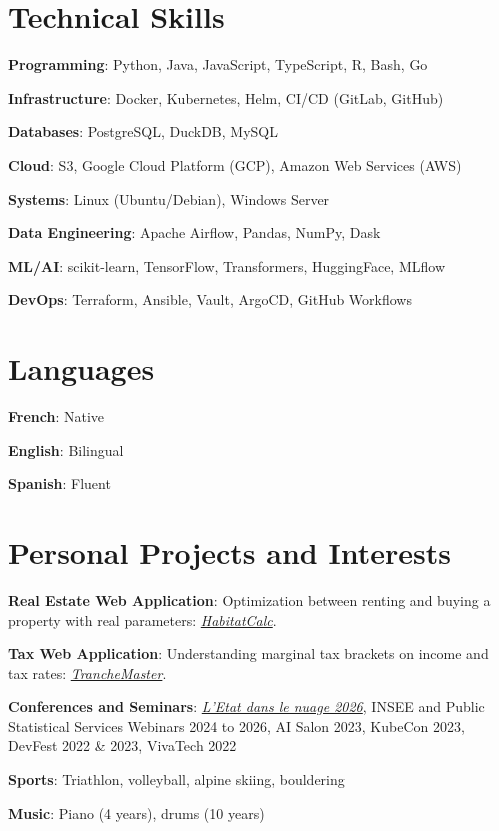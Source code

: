 \documentclass[a4paper,10pt]{article}
\newcommand{\resumeItem}[2]{
  \item\small{
    \textbf{#1}{: #2\vspace{-0.8pt}}
  }
}
\newcommand{\resumeSubItem}[2]{
    \small{\resumeItem{#1}{#2}\vspace{-4pt}}
	
}
\newcommand{\resumeSubHeadingListStart}{\begin{itemize}[leftmargin=*]}
\newcommand{\resumeSubHeadingListEnd}{\end{itemize}}
\begin{document}
\begin{minipage}[t]{0.65\linewidth}
    \section{Technical Skills}
    \resumeSubHeadingListStart
    \resumeSubItem{Programming}{Python, Java, JavaScript, TypeScript, R, Bash, Go}
    \resumeSubItem{Infrastructure}{Docker, Kubernetes, Helm, CI/CD (GitLab, GitHub)}
    \resumeSubItem{Databases}{PostgreSQL, DuckDB, MySQL}
    \resumeSubItem{Cloud}{S3, Google Cloud Platform (GCP), Amazon Web Services (AWS)}
    \resumeSubItem{Systems}{Linux (Ubuntu/Debian), Windows Server}
    \resumeSubItem{Data Engineering}{Apache Airflow, Pandas, NumPy, Dask}
    \resumeSubItem{ML/AI}{scikit-learn, TensorFlow, Transformers, HuggingFace, MLflow}
    \resumeSubItem{DevOps}{Terraform, Ansible, Vault, ArgoCD, GitHub Workflows}
    \resumeSubHeadingListEnd
    \end{minipage}
\hfill
\begin{minipage}[t]{0.3\linewidth}
    \section{Languages}
    \resumeSubHeadingListStart
    \resumeSubItem{French}{Native}
    \resumeSubItem{English}{Bilingual}
    \resumeSubItem{Spanish}{Fluent}
    \resumeSubHeadingListEnd
\end{minipage}



\section{Personal Projects and Interests}
\vspace{0.5mm}
\begin{minipage}[t]{0.9865\textwidth}
\resumeSubHeadingListStart
  \resumeSubItem{Real Estate Web Application}{Optimization between renting and buying a property with real parameters: \href{https://odysseu.github.io/HabitatCalc/}{\textit{HabitatCalc}}.} 
  \resumeSubItem{Tax Web Application}{Understanding marginal tax brackets on income and tax rates: \href{https://odysseu.github.io/TrancheMaster/}{\textit{TrancheMaster}}.} 
  \resumeSubItem{Conferences and Seminars}{\href{https://www.numerique.gouv.fr/agenda/etat-dans-le-nuage-2026/}{\textit{L'Etat dans le nuage 2026}}, INSEE and Public Statistical Services Webinars 2024 to 2026, AI Salon 2023, KubeCon 2023, DevFest 2022 \& 2023, VivaTech 2022}
  \resumeSubItem{Sports}{Triathlon, volleyball, alpine skiing, bouldering}
  \resumeSubItem{Music}{Piano (4 years), drums (10 years)}
\resumeSubHeadingListEnd
\end{minipage}


\end{document}
